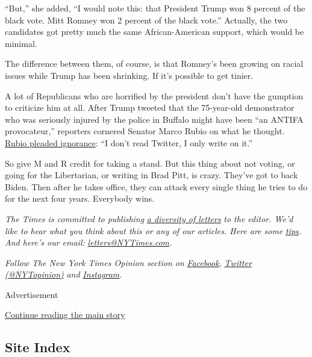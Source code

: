 ``But,'' she added, ``I would note this: that President Trump won 8
percent of the black vote. Mitt Romney won 2 percent of the black
vote.'' Actually, the two candidates got pretty much the same
African-American support, which would be minimal.

The difference between them, of course, is that Romney's been growing on
racial issues while Trump has been shrinking. If it's possible to get
tinier.

A lot of Republicans who are horrified by the president don't have the
gumption to criticize him at all. After Trump tweeted that the
75-year-old demonstrator who was seriously injured by the police in
Buffalo might have been ``an ANTIFA provocateur,'' reporters cornered
Senator Marco Rubio on what he thought.
\href{https://www.cnn.com/2020/06/09/politics/trump-buffalo-protester-set-up-tweet/index.html}{Rubio
pleaded ignorance}: ``I don't read Twitter, I only write on it.''

So give M and R credit for taking a stand. But this thing about not
voting, or going for the Libertarian, or writing in Brad Pitt, is crazy.
They've got to back Biden. Then after he takes office, they can attack
every single thing he tries to do for the next four years. Everybody
wins.

\emph{The Times is committed to publishing}
\href{https://www.nytimes3xbfgragh.onion/2019/01/31/opinion/letters/letters-to-editor-new-york-times-women.html}{\emph{a
diversity of letters}} \emph{to the editor. We'd like to hear what you
think about this or any of our articles. Here are some}
\href{https://help.nytimes3xbfgragh.onion/hc/en-us/articles/115014925288-How-to-submit-a-letter-to-the-editor}{\emph{tips}}\emph{.
And here's our email:}
\href{mailto:letters@NYTimes.com}{\emph{letters@NYTimes.com}}\emph{.}

\emph{Follow The New York Times Opinion section on}
\href{https://www.facebookcorewwwi.onion/nytopinion}{\emph{Facebook}}\emph{,}
\href{http://twitter.com/NYTOpinion}{\emph{Twitter (@NYTopinion)}}
\emph{and}
\href{https://www.instagram.com/nytopinion/}{\emph{Instagram}}\emph{.}

Advertisement

\protect\hyperlink{after-bottom}{Continue reading the main story}

\hypertarget{site-index}{%
\subsection{Site Index}\label{site-index}}

